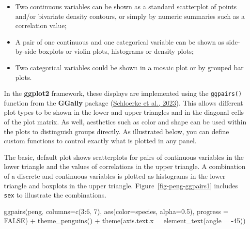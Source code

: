 \documentclass[
  letterpaper,
  10pt,
  krantz2]{krantz}
\makeatletter
\newenvironment{Shaded}{\begin{snugshade}}{\end{snugshade}}
\newcommand{\AttributeTok}[1]{\textcolor[rgb]{0.40,0.45,0.13}{#1}}
\newcommand{\ConstantTok}[1]{\textcolor[rgb]{0.56,0.35,0.01}{#1}}
\newcommand{\DecValTok}[1]{\textcolor[rgb]{0.68,0.00,0.00}{#1}}
\newcommand{\FloatTok}[1]{\textcolor[rgb]{0.68,0.00,0.00}{#1}}
\newcommand{\FunctionTok}[1]{\textcolor[rgb]{0.28,0.35,0.67}{#1}}
\newcommand{\NormalTok}[1]{\textcolor[rgb]{0.00,0.23,0.31}{#1}}
\newcommand{\SpecialCharTok}[1]{\textcolor[rgb]{0.37,0.37,0.37}{#1}}
\providecommand{\tightlist}{%
  \setlength{\itemsep}{0pt}\setlength{\parskip}{0pt}}\usepackage{longtable,booktabs,array}
\newenvironment{kframe}{%
  \medskip{}
  \setlength{\fboxsep}{.8em}
  \def\at@end@of@kframe{}%
  \ifinner\ifhmode%
  \def\at@end@of@kframe{\end{minipage}}%
  \begin{minipage}{\columnwidth}%
  \fi\fi%
  \def\FrameCommand##1{\hskip\@totalleftmargin \hskip-\fboxsep
  \colorbox{shadecolor}{##1}\hskip-\fboxsep
      \hskip-\linewidth \hskip-\@totalleftmargin \hskip\columnwidth}%
  \MakeFramed {\advance\hsize-\width
    \@totalleftmargin\z@ \linewidth\hsize
    \@setminipage}}%
{\par\unskip\endMakeFramed%
  \at@end@of@kframe}
\renewenvironment{Shaded}{\begin{kframe}}{\end{kframe}}
\makeatother
\begin{document}
\begin{itemize}
\tightlist
\item
  Two continuous variables can be shown as a standard scatterplot of
  points and/or bivariate density contours, or simply by numeric
  summaries such as a correlation value;
\item
  A pair of one continuous and one categorical variable can be shown as
  side-by-side boxplots or violin plots, histograms or density plots;
\item
  Two categorical variables could be shown in a mosaic plot or by
  grouped bar plots.
\end{itemize}

In the \textbf{ggplot2} framework, these displays are implemented using
the \texttt{ggpairs()} function from the \textbf{GGally} package
(\protect\hyperlink{ref-R-GGally}{Schloerke et al., 2023}). This allows
different plot types to be shown in the lower and upper triangles and in
the diagonal cells of the plot matrix. As well, aesthetics such as color
and shape can be used within the plots to distinguish groups directly.
As illustrated below, you can define custom functions to control exactly
what is plotted in any panel.

The basic, default plot shows scatterplots for pairs of continuous
variables in the lower triangle and the values of correlations in the
upper triangle. A combination of a discrete and continuous variables is
plotted as histograms in the lower triangle and boxplots in the upper
triangle. Figure~\ref{fig-peng-ggpairs1} includes \texttt{sex} to
illustrate the combinations.

\begin{Shaded}
\begin{Highlighting}[]
\FunctionTok{ggpairs}\NormalTok{(peng, }\AttributeTok{columns=}\FunctionTok{c}\NormalTok{(}\DecValTok{3}\SpecialCharTok{:}\DecValTok{6}\NormalTok{, }\DecValTok{7}\NormalTok{),}
        \FunctionTok{aes}\NormalTok{(}\AttributeTok{color=}\NormalTok{species, }\AttributeTok{alpha=}\FloatTok{0.5}\NormalTok{),}
        \AttributeTok{progress =} \ConstantTok{FALSE}\NormalTok{) }\SpecialCharTok{+}
  \FunctionTok{theme\_penguins}\NormalTok{() }\SpecialCharTok{+}
  \FunctionTok{theme}\NormalTok{(}\AttributeTok{axis.text.x =} \FunctionTok{element\_text}\NormalTok{(}\AttributeTok{angle =} \SpecialCharTok{{-}}\DecValTok{45}\NormalTok{))}
\end{Highlighting}
\end{Shaded}
\end{document}
